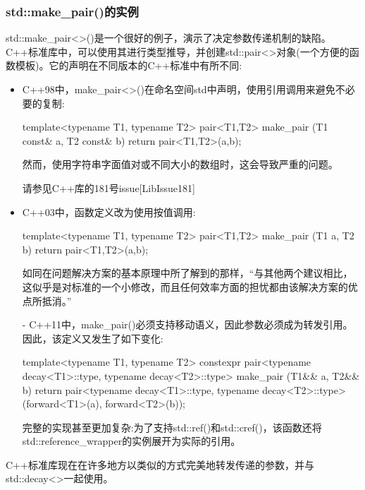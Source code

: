 \subsubsection{std::make\_pair()的实例}

std::make\_pair<>()是一个很好的例子，演示了决定参数传递机制的缺陷。C++标准库中，可以使用其进行类型推导，并创建std::pair<>对象(一个方便的函数模板)。它的声明在不同版本的C++标准中有所不同:

\begin{itemize}
\item
C++98中，make\_pair<>()在命名空间std中声明，使用引用调用来避免不必要的复制:

\begin{cpp}
template<typename T1, typename T2>
pair<T1,T2> make_pair (T1 const& a, T2 const& b)
{
	return pair<T1,T2>(a,b);
}
\end{cpp}

然而，使用字符串字面值对或不同大小的数组时，这会导致严重的问题。

\begin{notice}
请参见C++库的181号issue[LibIssue181]
\end{notice}

\item
C++03中，函数定义改为使用按值调用:

\begin{cpp}
template<typename T1, typename T2>
pair<T1,T2> make_pair (T1 a, T2 b)
{
	return pair<T1,T2>(a,b);
}
\end{cpp}

如同在问题解决方案的基本原理中所了解到的那样，“与其他两个建议相比，这似乎是对标准的一个小修改，而且任何效率方面的担忧都由该解决方案的优点所抵消。”

\item[-]
C++11中，make\_pair()必须支持移动语义，因此参数必须成为转发引用。因此，该定义又发生了如下变化:

\begin{cpp}
template<typename T1, typename T2>
constexpr pair<typename decay<T1>::type, typename decay<T2>::type>
make_pair (T1&& a, T2&& b)
{
	return pair<typename decay<T1>::type,
				typename decay<T2>::type>(forward<T1>(a),
										  forward<T2>(b));
}
\end{cpp}

完整的实现甚至更加复杂:为了支持std::ref()和std::cref()，该函数还将std::reference\_wrapper的实例展开为实际的引用。
\end{itemize}

C++标准库现在在许多地方以类似的方式完美地转发传递的参数，并与std::decay<>一起使用。


















